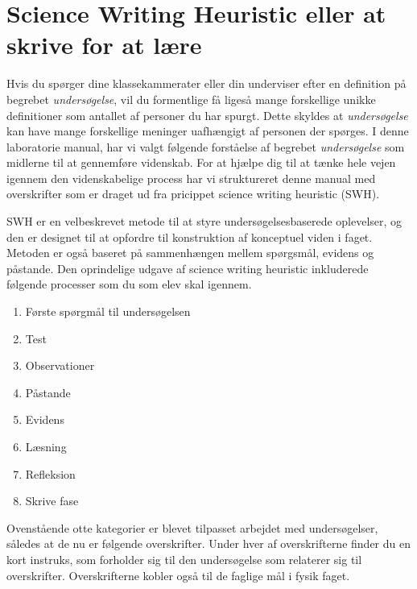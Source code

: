 
\chapter{Science Writing Heuristic eller at skrive for at lære}
 \label{app:A}
 
 Hvis du spørger dine klassekammerater eller din underviser efter en definition på begrebet \emph{undersøgelse}, vil du formentlige få ligeså mange forskellige unikke definitioner som antallet af personer du har spurgt. Dette skyldes at \emph{undersøgelse} kan have mange forskellige meninger uafhængigt af personen der spørges. I denne laboratorie manual, har vi valgt følgende forståelse af begrebet \emph{undersøgelse} som midlerne til at gennemføre videnskab. For at hjælpe dig til at tænke hele vejen igennem den videnskabelige process har vi struktureret denne manual med overskrifter som er draget ud fra pricippet science writing heuristic (SWH).
 
SWH er en velbeskrevet metode til at styre undersøgelsesbaserede oplevelser, og den er designet til at opfordre til konstruktion af konceptuel viden i faget. Metoden er også baseret på sammenhængen mellem spørgsmål, evidens og påstande. Den oprindelige udgave af science writing heuristic inkluderede følgende processer som du som elev skal igennem.
 
 \begin{enumerate}
 	\item Første spørgmål til undersøgelsen\vspace{-15pt}
 	\item Test\vspace{-15pt}
 	\item Observationer\vspace{-15pt}
 	\item Påstande\vspace{-15pt}
 	\item Evidens\vspace{-15pt}
 	\item Læsning\vspace{-15pt}
 	\item Refleksion\vspace{-15pt}
 	\item Skrive fase
\end{enumerate}

Ovenstående otte kategorier er blevet tilpasset arbejdet med undersøgelser, således at de nu er følgende overskrifter. Under hver af overskrifterne finder du en kort instruks, som forholder sig til den undersøgelse som relaterer sig til overskrifter. Overskrifterne kobler også til de faglige mål i fysik faget.

